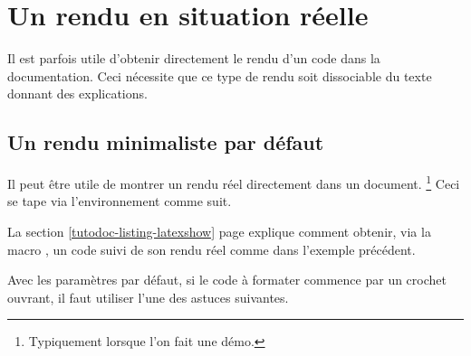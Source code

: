 \documentclass{../main/main}
\begin{document}
\section{Un rendu en situation réelle}
\label{tutodoc-showcase}

Il est parfois utile d'obtenir directement le rendu d'un code dans la documentation. Ceci nécessite que ce type de rendu soit dissociable du texte donnant des explications.



\subsection{Un rendu minimaliste par défaut}

\begin{tdocexa}
    Il peut être utile de montrer un rendu réel directement dans un document.%
    \footnote{
        Typiquement lorsque l'on fait une démo.
    }
    Ceci se tape via l'environnement  comme suit.

\end{tdocexa}


\begin{tdocrem}
    La section \ref{tutodoc-listing-latexshow} page \pageref{tutodoc-listing-latexshow} explique comment obtenir, via la macro , un code suivi de son rendu réel comme dans l'exemple précédent.
\end{tdocrem}


\begin{tdocwarn}
    Avec les paramètres par défaut, si le code à formater commence par un crochet ouvrant, il faut utiliser l'une des astuces suivantes.

\end{tdocwarn}
\end{document}
